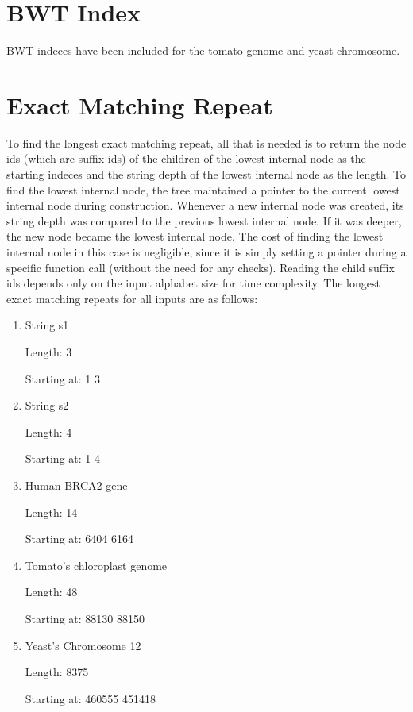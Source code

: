 \documentclass[12pt,a4paper]{article}
\begin{document}
\section{BWT Index}
BWT indeces have been included for the tomato genome and yeast chromosome.
\section{Exact Matching Repeat}
To find the longest exact matching repeat, all that is needed is to return the node ids (which are suffix ids) of the children of the lowest internal node as the starting indeces and the string depth of the lowest internal node as the length. To find the lowest internal node, the tree maintained a pointer to the current lowest internal node during construction. Whenever a new internal node was created, its string depth was compared to the previous lowest internal node. If it was deeper, the new node became the lowest internal node. The cost of finding the lowest internal node in this case is negligible, since it is simply setting a pointer during a specific function call (without the need for any checks). Reading the child suffix ids depends only on the input alphabet size for time complexity. The longest exact matching repeats for all inputs are as follows:
\begin{enumerate}
\item String s1

 Length: 3
 
 Starting at: 1 3
 
\item String s2

 Length: 4
 
 Starting at: 1 4
 
\item Human BRCA2 gene

 Length: 14
 
 Starting at: 6404 6164
 
\item Tomato's chloroplast genome

 Length: 48
 
 Starting at: 88130 88150
 
\item Yeast's Chromosome 12

Length: 8375
 
 Starting at: 460555 451418

\end{enumerate}
\end{document}
